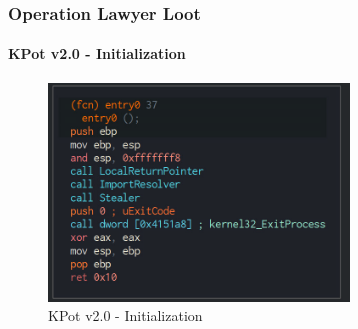 \documentclass[aspectratio=169]{beamer}
\begin{document}
{
\begin{frame}
  \frametitle{Operation Lawyer Loot}
  \framesubtitle{KPot v2.0 - Initialization}
  \begin{figure}
    \includegraphics[width=8cm]{kpot-entry0}
    \caption{KPot v2.0 - Initialization}
  \end{figure}
\end{frame}
}
\end{document}
